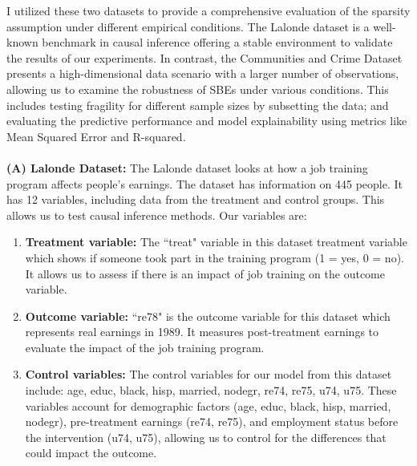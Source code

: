 I utilized these two datasets to provide a comprehensive evaluation of the sparsity
assumption under different empirical conditions. The Lalonde dataset is a well-
known benchmark in causal inference offering a stable environment to validate the
results of our experiments. In contrast, the Communities and Crime Dataset
presents a high-dimensional data scenario with a larger number of observations,
allowing us to examine the robustness of SBEs under various conditions. This includes testing fragility for different sample sizes by subsetting the data; and evaluating the predictive performance and model explainability using metrics like Mean Squared Error and R-squared. \\
\\
\textbf{(A) Lalonde Dataset:} The Lalonde dataset looks at how a job training program affects people's earnings. The dataset has information on 445 people. It has 12 variables, including data from the treatment and control groups. This allows us to test causal inference methods. Our variables are:
\begin{enumerate}
    \item \textbf{Treatment variable:} The ``treat" variable in this dataset treatment variable which shows if someone took part in the training program (1 = yes, 0 = no). It allows us to assess if there is an impact of job training on the outcome variable. 
    \item \textbf{Outcome variable:} ``re78" is the outcome variable for this dataset which represents real earnings in 1989. It measures post-treatment earnings to evaluate the impact of the job training program. 
    \item \textbf{Control variables:} The control variables for our model from this dataset include: age, educ, black, hisp, married, nodegr, re74, re75, u74, u75. These variables account for demographic factors (age, educ, black, hisp, married, nodegr), pre-treatment earnings (re74, re75), and employment status before the intervention (u74, u75), allowing us to control for the differences that could impact the outcome. 
\end{enumerate}

